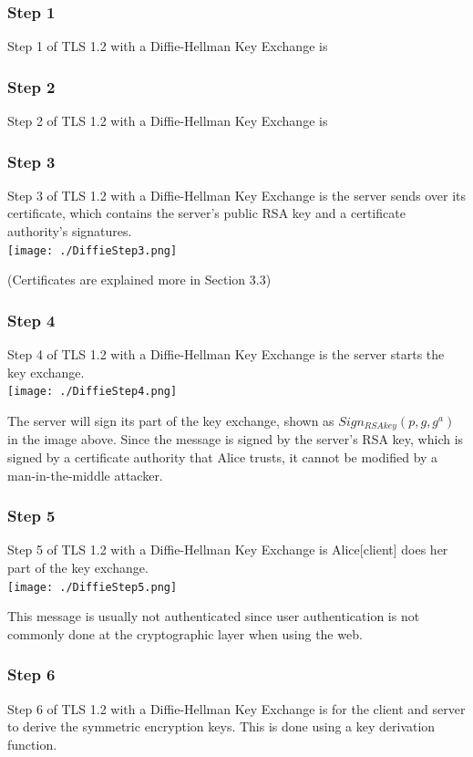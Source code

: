 \documentclass[11pt]{article} %
\begin{document}
\subsubsection{Step 1}
Step 1 of TLS 1.2 with a Diffie-Hellman Key Exchange is 

\newpage
\subsubsection{Step 2}
Step 2 of TLS 1.2 with a Diffie-Hellman Key Exchange is 

\newpage
\subsubsection{Step 3}
Step 3 of TLS 1.2 with a Diffie-Hellman Key Exchange is the server sends over 
its certificate, which contains the server’s public RSA key and a certificate 
authority's signatures.\\

\texttt{[image: ./DiffieStep3.png]}

(Certificates are explained more in Section 3.3)

\subsubsection{Step 4}
Step 4 of TLS 1.2 with a Diffie-Hellman Key Exchange is the server starts the 
key exchange.\\

\texttt{[image: ./DiffieStep4.png]}

 The server will sign its part of the key exchange, shown as 
 $Sign_{RSAkey}(p,g,g^a)$ in the image above. Since the message is signed by 
 the server's RSA key, which is signed by a certificate authority that Alice 
 trusts, it cannot be modified by a man-in-the-middle attacker.

\newpage
\subsubsection{Step 5}
Step 5 of TLS 1.2 with a Diffie-Hellman Key Exchange is Alice[client] does her 
part of the key exchange. \\

\texttt{[image: ./DiffieStep5.png]}

This message is usually not authenticated since user authentication is not 
commonly done at the cryptographic layer when using the web.

\subsubsection{Step 6}
Step 6 of TLS 1.2 with a Diffie-Hellman Key Exchange is for the client and 
server to derive the symmetric encryption keys. This is done using a key 
derivation function. \\
\end{document}
